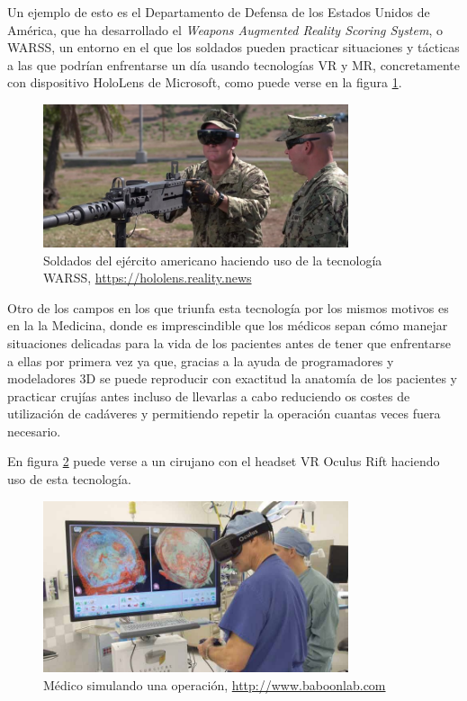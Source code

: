Un ejemplo de esto es el Departamento de Defensa de los Estados Unidos de América, que ha desarrollado el \textit{Weapons Augmented Reality Scoring System}, o WARSS, un entorno en el que los soldados pueden practicar situaciones y tácticas a las que podrían enfrentarse un día usando tecnologías \acs{VR} y \acs{MR}, concretamente con dispositivo HoloLens de Microsoft, como puede verse en la figura \ref{fig:warss}.

\begin{figure}[!h]
\begin{center}
\includegraphics[width=0.8\textwidth]{imagenes/2/WARSS.jpg}
\caption{Soldados del ejército americano haciendo uso de la tecnología WARSS, \url{https://hololens.reality.news}}
\label{fig:warss}
\end{center}
\end{figure}

Otro de los campos en los que triunfa esta tecnología por los mismos motivos es en la la Medicina, donde es imprescindible que los médicos sepan cómo manejar situaciones delicadas para la vida de los pacientes antes de tener que enfrentarse a ellas por primera vez ya que, gracias a la ayuda de programadores y modeladores 3D se puede reproducir con exactitud la anatomía de los pacientes y practicar crujías antes incluso de llevarlas a cabo reduciendo os costes de utilización de cadáveres y permitiendo repetir la operación cuantas veces fuera necesario.

En figura \ref{fig:medico} puede verse a un cirujano con el headset \acs{VR} Oculus Rift haciendo uso de esta tecnología.

\begin{figure}[!h]
\begin{center}
\includegraphics[width=0.8\textwidth]{imagenes/2/medicina.jpg}
\caption{Médico simulando una operación, \url{http://www.baboonlab.com}}
\label{fig:medico}
\end{center}
\end{figure}
 
